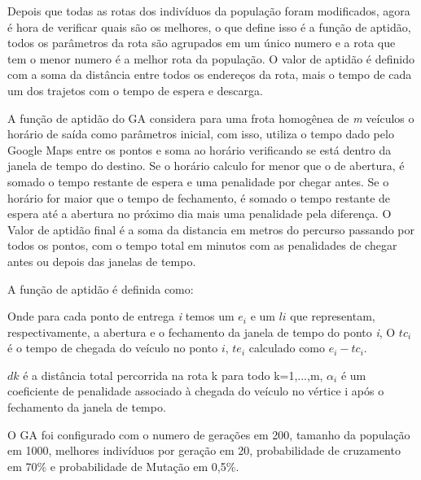Depois que todas as rotas dos indivíduos da população foram modificados, agora é hora de verificar quais são os melhores, o que define isso é a função de aptidão, todos os parâmetros da rota são agrupados em um único numero e a rota que tem o menor numero é a melhor rota da população. O valor de aptidão é definido com a soma da distância entre todos os endereços da rota, mais o tempo de cada um dos trajetos com o tempo de espera e descarga.

A função de aptidão do GA considera para uma frota homogênea de \textit{m} veículos o horário de saída como parâmetros inicial, com isso, utiliza o tempo dado pelo Google Maps entre os pontos e soma ao horário verificando se está dentro da janela de tempo do destino. Se o horário calculo for menor que o de abertura, é somado o tempo restante de espera e uma penalidade por chegar antes. Se o horário for maior que o tempo de fechamento, é somado o tempo restante de espera até a abertura no próximo dia mais uma penalidade pela diferença. O Valor de aptidão final é a soma da distancia em metros do percurso passando por todos os pontos, com o tempo total em minutos com as penalidades de chegar antes ou depois das janelas de tempo.

A função de aptidão é definida como:

\begin{center}
	\label{fig:MetodoAptidao}
\end{center}

Onde para cada ponto de entrega \textit{i} temos um \(e_i\)
e um \(li\)  que representam, respectivamente, a abertura e o fechamento
da janela de tempo do ponto \textit{i}, O \(tc_i\) é o tempo de chegada do veículo no ponto \(i\), \(te_i\) calculado como \(e_i - tc_i\). 

\(dk\) é a distância total percorrida na rota k para todo k=1,...,m, \(\alpha_i\)
é um coeficiente de penalidade associado à chegada do veículo no vértice i após o fechamento da janela de tempo.


O GA foi configurado com o numero de gerações em 200, tamanho da população em 1000, melhores indivíduos por geração em 20, probabilidade de cruzamento em 70\% e probabilidade de Mutação em 0,5\%.

